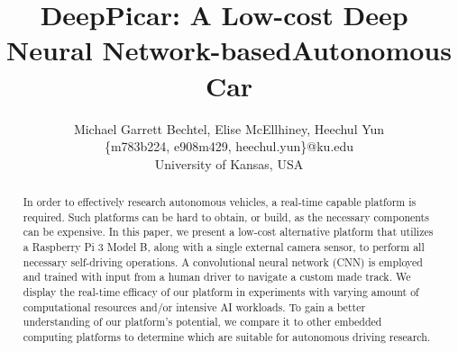 \documentclass[10pt, conference]{IEEEtran}
\begin{document}
\title{DeepPicar:​ ​A​ ​Low-cost​ ​Deep​ ​Neural​ ​Network-based​ ​Autonomous​ ​Car}
\author{Michael Garrett Bechtel, Elise McEllhiney, Heechul Yun\\
\{m783b224, e908m429, heechul.yun\}@ku.edu\\
University of Kansas, USA\\ 
}

\maketitle
\thispagestyle{empty}
\begin{abstract}
In order to effectively research autonomous vehicles, a real-time
capable platform is required. Such platforms can be hard to obtain, or
build, as the necessary components can be expensive. In this paper,
we present a low-cost alternative platform that utilizes a Raspberry
Pi 3 Model B, along with a single external camera sensor, to perform
all necessary self-driving operations. A convolutional neural network
(CNN) is employed and trained with input from a human driver to
navigate a custom made track. We display the real-time efficacy of our
platform in experiments with varying amount of computational resources
and/or intensive AI workloads. To gain a better understanding of our
platform's potential, we compare it to other embedded computing
platforms to determine which are suitable for autonomous driving
research.
\end{abstract}











\appendix

\end{document}
